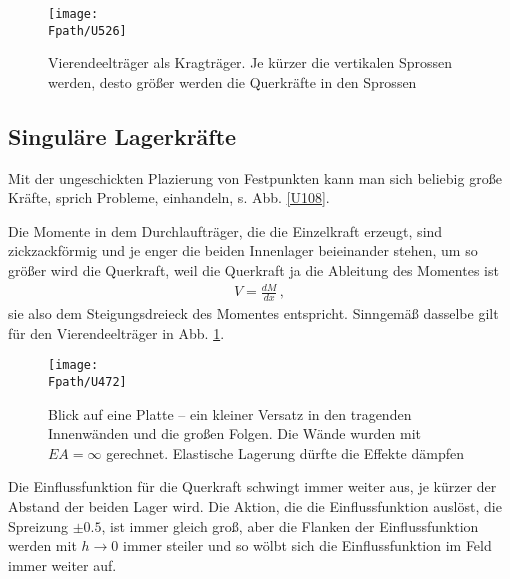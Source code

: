 \begin{figure}
\centering
\texttt{[image: \\Fpath/U526]}
\caption{Vierendeeltr\"{a}ger als Kragtr\"{a}ger. Je k\"{u}rzer die vertikalen Sprossen werden, desto gr\"{o}{\ss}er werden die Querkr\"{a}fte in den Sprossen}
\label{U526}%
\end{figure}%

{\textcolor{sectionTitleBlue}{\section{Singul\"{a}re Lagerkr\"{a}fte}}}\label{Korrektur9}

Mit der ungeschickten Plazierung von Festpunkten kann man sich beliebig gro{\ss}e Kr\"{a}fte, sprich Probleme, einhandeln, s. Abb. \ref{U108}.

Die Momente in dem Durchlauftr\"{a}ger, die die Einzelkraft erzeugt, sind zickzackf\"{o}rmig und je enger die beiden Innenlager beieinander stehen, um so gr\"{o}{\ss}er wird die Querkraft, weil die Querkraft ja die Ableitung des Momentes ist
\begin{align}
V = \frac{dM}{dx}\,,
\end{align}
sie also dem Steigungsdreieck des Momentes entspricht. Sinngem\"{a}{\ss} dasselbe gilt f\"{u}r den Vierendeeltr\"{a}ger in Abb. \ref{U526}.
\begin{figure}
\centering
\texttt{[image: \\Fpath/U472]}
\caption{Blick auf eine Platte -- ein kleiner Versatz in den tragenden Innenw\"{a}nden und die gro{\ss}en Folgen. Die W\"{a}nde wurden mit $EA = \infty$ gerechnet. Elastische Lagerung d\"{u}rfte die Effekte d\"{a}mpfen}
\label{U472}%
\end{figure}%

Die Einflussfunktion f\"{u}r die Querkraft schwingt immer weiter aus, je k\"{u}rzer der Abstand der beiden Lager wird. Die Aktion, die die Einflussfunktion ausl\"{o}st, die Spreizung $\pm 0.5$, ist immer gleich gro{\ss}, aber die Flanken der Einflussfunktion werden mit $h \to 0$ immer steiler und so w\"{o}lbt sich die Einflussfunktion im Feld immer weiter auf.

